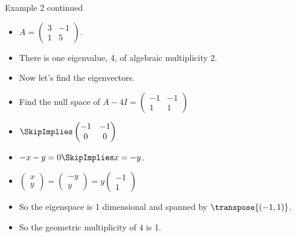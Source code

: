 \documentclass{beamer}
\begin{document}
\begin{frame}{Example 2 continued}

\begin{itemize}
\item $A=
\begin{pmatrix}
3 & -1 \\
1 & 5
\end{pmatrix}
$.
\item There is one eigenvalue, 4, of algebraic multiplicity 2.
\item Now let's find the eigenvectors.
\item Find the null space of $A-4 I=
\begin{pmatrix}
-1 & -1 \\
1 & 1
\end{pmatrix}
$
\item
$
\SkipImplies
\begin{pmatrix}
-1 & -1 \\
0 & 0
\end{pmatrix}
$
\item $-x -y = 0 \SkipImplies x=-y$.
\item $
\begin{pmatrix}
x \\ y
\end{pmatrix}
=
\begin{pmatrix}
-y \\ y
\end{pmatrix}
=
y
\begin{pmatrix}
-1 \\ 1
\end{pmatrix}
$
\item So the eigenspace is 1 dimensional and spanned by $\transpose{(-1, 1)}$.
\item So the geometric multiplicity of $4$ is 1.
\end{itemize}
\end{frame}
\end{document}
